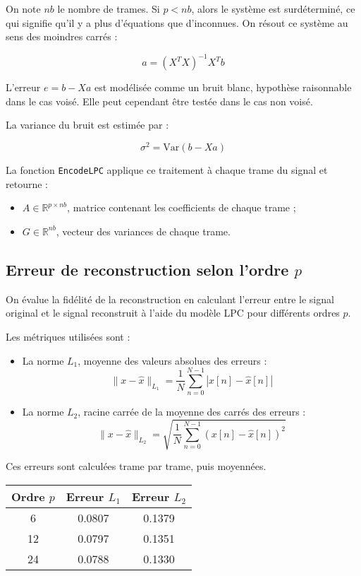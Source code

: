 \documentclass[11pt]{article}
\begin{document}
On note \( nb \) le nombre de trames. Si \( p < nb \), alors le système est surdéterminé, ce qui signifie qu’il y a plus d’équations que d’inconnues. On résout ce système au sens des moindres carrés :

\[
a = (X^T X)^{-1} X^T b
\]

L’erreur \( e = b - Xa \) est modélisée comme un bruit blanc, hypothèse raisonnable dans le cas voisé. Elle peut cependant être testée dans le cas non voisé.

La variance du bruit est estimée par :

\[
\sigma^2 = \text{Var}(b - Xa)
\]

La fonction \texttt{EncodeLPC} applique ce traitement à chaque trame du signal et retourne :
\begin{itemize}
    \item \( A \in \mathbb{R}^{p \times nb} \), matrice contenant les coefficients de chaque trame ;
    \item \( G \in \mathbb{R}^{nb} \), vecteur des variances de chaque trame.
\end{itemize}

\subsection{Erreur de reconstruction selon l'ordre \( p \)}

On évalue la fidélité de la reconstruction en calculant l’erreur entre le signal original et le signal reconstruit à l’aide du modèle LPC pour différents ordres \( p \).

Les métriques utilisées sont :
\begin{itemize}
    \item La norme \( L_1 \), moyenne des valeurs absolues des erreurs :
    \[
    \|x - \hat{x}\|_{L_1} = \frac{1}{N} \sum_{n=0}^{N-1} |x[n] - \hat{x}[n]|
    \]
    \item La norme \( L_2 \), racine carrée de la moyenne des carrés des erreurs :
    \[
    \|x - \hat{x}\|_{L_2} = \sqrt{ \frac{1}{N} \sum_{n=0}^{N-1} (x[n] - \hat{x}[n])^2 }
    \]
\end{itemize}

Ces erreurs sont calculées trame par trame, puis moyennées. 

\begin{center}
\begin{tabular}{|c|c|c|}
\hline
Ordre \( p \) & Erreur \( L_1 \) & Erreur \( L_2 \) \\
\hline
6 & 0.0807 & 0.1379 \\
12 & 0.0797 & 0.1351 \\
24 & 0.0788 & 0.1330 \\
\hline
\end{tabular}
\end{center}
\end{document}
